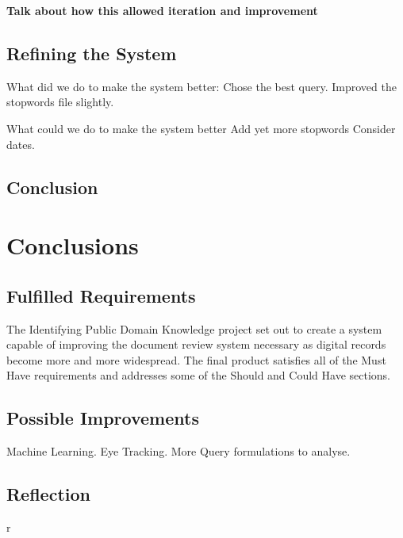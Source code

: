 \documentclass{l4proj}
\begin{document}
\textbf{Talk about how this allowed iteration and improvement}

\section{Refining the System}
What did we do to make the system better:
Chose the best query.
Improved the stopwords file slightly.

What could we do to make the system better
Add yet more stopwords
Consider dates.

\section{Conclusion}

\chapter{Conclusions}
\section{Fulfilled Requirements}
The Identifying Public Domain Knowledge project set out to create a system capable of improving the document review system necessary as digital records become more and more widespread.
The final product satisfies all of the Must Have requirements and addresses some of the Should and Could Have sections. 
\section{Possible Improvements}
Machine Learning. Eye Tracking. More Query formulations to analyse.

\section{Reflection}

\begin{appendices}  r

\end{appendices}




\end{document}
